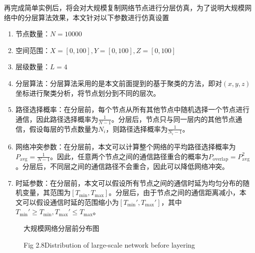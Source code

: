 \documentclass[UTF8,a4paper,12pt]{ctexart}
\numberwithin{equation}{section}
\begin{document}
	再完成简单实例后，将会对大规模复制网络节点进行分层仿真，为了说明大规模网络中的分层算法效果，本文针对以下参数进行仿真设置
	\begin{enumerate}
		\item 节点数量：$N = 10000$
		\item 空间范围：$X = [0, 100], Y = [0, 100], Z = [0, 100]$
		\item 层级数量：$L = 4$
		\item 分层算法：分层算法采用的是本文前面提到的基于聚类的方法，即对$(x, y, z)$坐标进行聚类分析，将节点划分到不同的层次。
		\item 路径选择概率：在分层前，每个节点从所有其他节点中随机选择一个节点进行通信，因此路径选择概率为$\frac{1}{N-1}$。分层后，节点只与同一层内的其他节点通信，假设每层的节点数量为$N_i$，则路径选择概率为$\frac{1}{N_i-1}$。
		\item 网络冲突参数：在分层前，本文可以计算整个网络的平均路径选择概率为$P_{\text{avg}} = \frac{1}{N-1}$。因此，任意两个节点之间的通信路径重合的概率为$P_{\text{overlap}} = P_{\text{avg}}^2$。分层后，不同层之间的通信路径不会重合，因此可以降低网络冲突。
		\item 时延参数：在分层前，本文可以假设所有节点之间的通信时延为均匀分布的随机变量，其范围为$[T_{\text{min}}, T_{\text{max}}]$。分层后，由于节点之间的通信距离减小，本文可以假设通信时延的范围缩小为$[T_{\text{min}}', T_{\text{max}}']$，其中$T_{\text{min}}' \ge T_{\text{min}}, T_{\text{max}}' \le T_{\text{max}}$。
	\end{enumerate}
	\begin{figure}[H] 
		\caption{大规模网络分层前分布图}
		\vspace{-10pt}
		\caption*{Fig 2.8\quad Distribution of large-scale network before layering}
	\end{figure}
	
\end{document}

